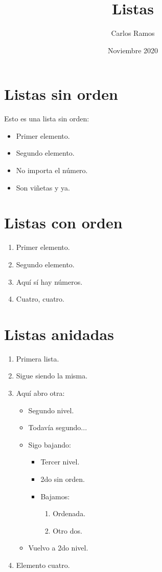 \documentclass{article}
\title{Listas}
\author{Carlos Ramos}
\date{Noviembre 2020}
\begin{document}
\maketitle

\section{Listas sin orden}

Esto es una lista sin orden:

\begin{itemize}
	\item Primer elemento.
	\item Segundo elemento.
	\item No importa el número.
	\item Son viñetas y ya.
\end{itemize}

\section{Listas con orden}

\begin{enumerate}
	\item Primer elemento.
	\item Segundo elemento.
	\item Aquí sí hay números.
	\item Cuatro, cuatro.
\end{enumerate}

\section{Listas anidadas}

\begin{enumerate}
	\item Primera lista.
	\item Sigue siendo la misma.
	\item Aquí abro otra:
	\begin{itemize}
		\item Segundo nivel.
		\item Todavía segundo...
		\item Sigo bajando:
		\begin{itemize}
			\item Tercer nivel.
			\item 2do sin orden.
			\item Bajamos:
			\begin{enumerate}
				\item Ordenada.
				\item Otro dos.
			\end{enumerate}
		\end{itemize}
		\item Vuelvo a 2do nivel.
	\end{itemize}
	\item Elemento cuatro.
\end{enumerate}
\end{document}
